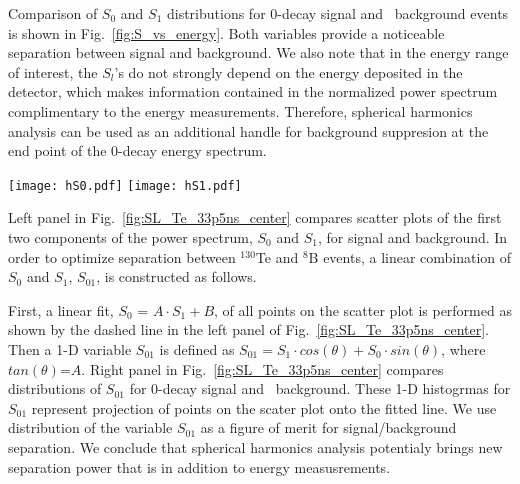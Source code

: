 Comparison of $S_0$ and $S_1$ distributions for 0\nbb-decay signal and \B~background events is shown in Fig.~\ref{fig:S_vs_energy}.
Both variables provide a noticeable separation between signal and background. We also note that in the energy range of interest, 
the $S_l$'s do not strongly depend on the energy deposited in the detector, which makes information contained in the normalized power 
spectrum complimentary to the energy measurements. Therefore, spherical harmonics analysis can be used as an additional handle for
background suppresion at the end point of the 0\nbb-decay energy spectrum.

\begin{figure*}[h]
\centering
\texttt{[image: hS0.pdf]}
\texttt{[image: hS1.pdf]}
\caption{$S_0$ (\emph{left}) and $S_1$ (\emph{right}) distributions for 1000 simulated 0\nbb-decay signal and \B~background events.
  Two different isotopes are compared, $^{130}$Te and $^{82}$Se. Corresponding kinetic energies of \B~single electrons are
  2.53 MeV and 3.00 MeV. Central events assuming perfect reconstruction of vertex position. Time cut of 33.5~ns on the PE arrival time is
  applied. The default QE and 100\% photo-coverage is used in the simulation.}
\label{fig:S_vs_energy}
\end{figure*}

Left panel in Fig.~\ref{fig:SL_Te_33p5ns_center} compares scatter plots of the first two components of the power spectrum, 
$S_0$ and $S_1$, for signal and background. In order to optimize separation between $^{130}$Te and $^{8}$B
events, a linear combination of $S_0$ and $S_1$, $S_{01}$, is constructed as follows. 

First, a linear fit, $S_0$ = $A \cdot S_1 + B$, of all points on the scatter plot is performed as shown by the dashed 
line in the left panel of Fig.~\ref{fig:SL_Te_33p5ns_center}. Then a 1-D variable $S_{01}$ is defined as
$S_{01} = S_1 \cdot cos(\theta) + S_0 \cdot sin(\theta)$, where $tan(\theta)$=$A$. Right panel in Fig.~\ref{fig:SL_Te_33p5ns_center}
compares distributions of $S_{01}$ for 0\nbb-decay signal and \B~background. These 1-D histogrmas for $S_{01}$ represent
projection of points on the scater plot onto the fitted line. We use distribution of the variable $S_{01}$ as a figure of merit
for signal/background separation. We conclude that spherical harmonics analysis potentialy brings new separation power that is
in addition to energy measusrements.



